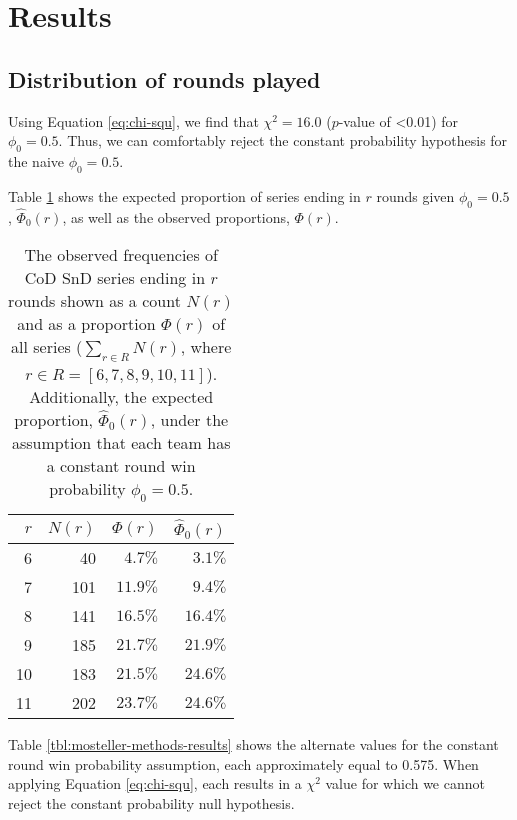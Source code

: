 \documentclass{article}
\begin{document}
\hypertarget{results}{%
\section{Results}\label{results}}

\hypertarget{distribution-of-rounds-played-1}{%
\subsection{Distribution of rounds
played}\label{distribution-of-rounds-played-1}}

Using Equation \ref{eq:chi-squ}, we find that \(\chi^2 = 16.0\)
(\(p\)-value of \textless0.01) for \(\phi_0 = 0.5\). Thus, we can
comfortably reject the constant probability hypothesis for the naive
\(\phi_0 = 0.5\).

Table \ref{tbl:prob-series-lasts-r-rounds} shows the expected proportion
of series ending in \(r\) rounds given \(\phi_0 = 0.5\),
\(\hat{\Phi}_0(r)\), as well as the observed proportions, \(\Phi(r)\).

\begin{table}
\caption{The observed frequencies of CoD SnD series ending in $r$ rounds shown as a count $N(r)$ and as a proportion $\Phi(r)$ of all series ($\sum_{r \in R} N(r)$, where $r \in R = [6, 7, 8, 9, 10, 11]$). Additionally, the expected proportion, $\hat{\Phi}_0(r)$, under the assumption that each team has a constant round win probability $\phi_0 = 0.5$.}

\centering
\begin{tabular}{rrrr}
\toprule
$r$ & $N(r)$ & $\Phi(r)$ & $\hat{\Phi}_0(r)$ \\ 
\midrule

6 & 40 & $4.7\%$ & $3.1\%$ \\ 
7 & 101 & $11.9\%$ & $9.4\%$ \\ 
8 & 141 & $16.5\%$ & $16.4\%$ \\ 
9 & 185 & $21.7\%$ & $21.9\%$ \\ 
10 & 183 & $21.5\%$ & $24.6\%$ \\ 
11 & 202 & $23.7\%$ & $24.6\%$ \\ 

\bottomrule
\end{tabular}

\label{tbl:prob-series-lasts-r-rounds}

\end{table}

Table \ref{tbl:mosteller-methods-results} shows the alternate values for
the constant round win probability assumption, each approximately equal
to 0.575. When applying Equation \ref{eq:chi-squ}, each results in a
\(\chi^2\) value for which we cannot reject the constant probability
null hypothesis.
\end{document}
